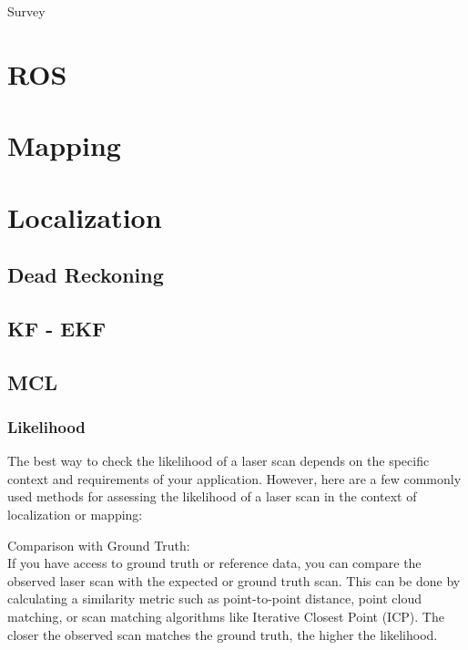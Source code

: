 \documentclass[]{article}
\title{}
\author{}
\begin{document}
\maketitle 


\begin{center}
Survey
\end{center}


\begin{abstract}

\end{abstract}

\tableofcontents

\section{ROS}

\section{Mapping}

\section{Localization}

\subsection{Dead Reckoning}
 
\subsection{KF - EKF}

\subsection{MCL}

\subsubsection*{Likelihood}

The best way to check the likelihood of a laser scan depends on the specific context and requirements of your application. However, here are a few commonly used methods for assessing the likelihood of a laser scan in the context of localization or mapping:

Comparison with Ground Truth:
\\
If you have access to ground truth or reference data, you can compare the observed laser scan with the expected or ground truth scan. This can be done by calculating a similarity metric such as point-to-point distance, point cloud matching, or scan matching algorithms like Iterative Closest Point (ICP). The closer the observed scan matches the ground truth, the higher the likelihood.
\end{document}
